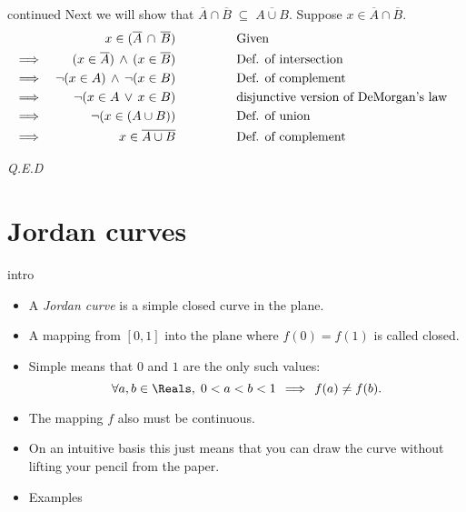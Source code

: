 \documentclass[handout,landscape]{beamer}
\begin{document}
\begin{frame}{continued}
Next we will show that $\overline{A} \cap \overline{B} \; \subseteq \; \overline{A \cup B}$.
Suppose $x \in \overline{A} \cap \overline{B}$.
\begin{align*}
 &          &  x \in ( \overline{A} \, \cap \, \overline{B}) \rule{48pt}{0pt} & \mbox{Given} & \\
 & \implies &  (x \in \overline{A}) \, \land  \, (x \in \overline{B}) \rule{48pt}{0pt} & \mbox{Def. of intersection} & \\
 & \implies & \lnot (x \in A) \, \land  \, \lnot (x \in B) \rule{48pt}{0pt} & \mbox{Def. of complement } & \\
 & \implies & \lnot (x \in A \, \lor \, x \in B) \rule{48pt}{0pt} & \mbox{disjunctive version of DeMorgan's law} & \\
 & \implies & \lnot (x \in (A \cup B)) \rule{48pt}{0pt} & \mbox{Def. of union} & \\
 & \implies & x \in \overline{A \cup B} \rule{48pt}{0pt} & \mbox{Def. of complement} & \\
\end{align*}

\rule{0pt}{0pt} \hfill {\em Q.E.D} 

\end{frame}

\section{Jordan curves}


\begin{frame}{intro}
\begin{itemize}
\item A {\em Jordan curve} is a simple closed curve in the plane. \pause
\item A mapping from $[0,1]$ into the plane where $f(0) = f(1)$ is called closed.\pause
\item Simple means that $0$ and $1$ are the only such values: \pause \newline
\[ \forall a, b \in \Reals, \; 0<a<b<1 \, \implies \, f(a) \neq f(b). \] \pause
\item The mapping $f$ also must be continuous.  \pause
\item On an intuitive basis this just means that you can draw the 
curve without lifting your pencil from the paper.\pause
\item Examples
\end{itemize}
\end{frame}
\end{document}

